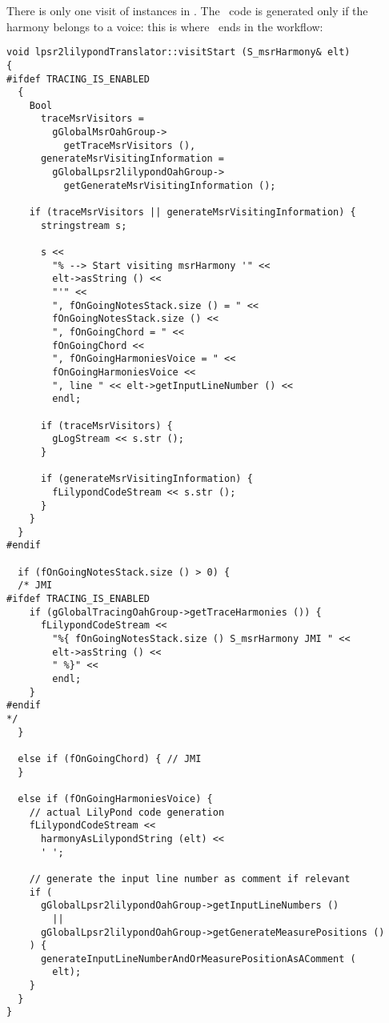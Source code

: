 There is only one visit of  instances in . The \lily\ code is generated only if the harmony belongs to a voice: this is where \denorm\ ends in the workflow:%
\begin{lstlisting}[language=CPlusPlus]
void lpsr2lilypondTranslator::visitStart (S_msrHarmony& elt)
{
#ifdef TRACING_IS_ENABLED
  {
    Bool
      traceMsrVisitors =
        gGlobalMsrOahGroup->
          getTraceMsrVisitors (),
      generateMsrVisitingInformation =
        gGlobalLpsr2lilypondOahGroup->
          getGenerateMsrVisitingInformation ();

    if (traceMsrVisitors || generateMsrVisitingInformation) {
      stringstream s;

      s <<
        "% --> Start visiting msrHarmony '" <<
        elt->asString () <<
        "'" <<
        ", fOnGoingNotesStack.size () = " <<
        fOnGoingNotesStack.size () <<
        ", fOnGoingChord = " <<
        fOnGoingChord <<
        ", fOnGoingHarmoniesVoice = " <<
        fOnGoingHarmoniesVoice <<
        ", line " << elt->getInputLineNumber () <<
        endl;

      if (traceMsrVisitors) {
        gLogStream << s.str ();
      }

      if (generateMsrVisitingInformation) {
        fLilypondCodeStream << s.str ();
      }
    }
  }
#endif

  if (fOnGoingNotesStack.size () > 0) {
  /* JMI
#ifdef TRACING_IS_ENABLED
    if (gGlobalTracingOahGroup->getTraceHarmonies ()) {
      fLilypondCodeStream <<
        "%{ fOnGoingNotesStack.size () S_msrHarmony JMI " <<
        elt->asString () <<
        " %}" <<
        endl;
    }
#endif
*/
  }

  else if (fOnGoingChord) { // JMI
  }

  else if (fOnGoingHarmoniesVoice) {
    // actual LilyPond code generation
    fLilypondCodeStream <<
      harmonyAsLilypondString (elt) <<
      ' ';

    // generate the input line number as comment if relevant
    if (
      gGlobalLpsr2lilypondOahGroup->getInputLineNumbers ()
        ||
      gGlobalLpsr2lilypondOahGroup->getGenerateMeasurePositions ()
    ) {
      generateInputLineNumberAndOrMeasurePositionAsAComment (
        elt);
    }
  }
}
\end{lstlisting}

